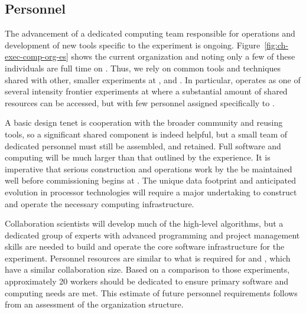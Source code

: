 \begin{dunetable}
\end{dunetable}

\subsection{Personnel}
\label{sec:exec-comp-gov-personnel}

The advancement of a dedicated  computing team responsible for operations and development of new tools specific to the  experiment is ongoing. %
Figure~\ref{fig:ch-exec-comp-org-es} shows the current  organization and noting only a few of these individuals are full time on .  Thus, we rely on common tools and techniques shared with other, smaller experiments at , and . In particular,  operates as one of several intensity frontier experiments at  where a substantial amount of shared resources can be accessed, but with few personnel assigned specifically to .  %

A basic design tenet is cooperation with the broader community and reusing tools, so a significant shared component is indeed helpful, but a small team of dedicated personnel must still be assembled, and retained. 
Full  software and computing will be much larger than that outlined by the  experience. It is imperative that serious construction and operations work by the  be maintained well before commissioning begins at . %
The unique  data footprint and anticipated evolution in processor technologies will require a major undertaking to construct and operate the necessary computing infrastructure. %

Collaboration scientists will develop much of the high-level algorithms, but a dedicated group of experts with advanced programming and project management skills are needed to build and operate the core software infrastructure for the experiment. %
Personnel resources are similar to what is required for  and , which have a similar collaboration size.  Based on a comparison to those experiments, approximately 20  workers should be dedicated to ensure primary  software and computing needs are met. %
This estimate of future personnel requirements follows from an assessment of the  organization structure.

